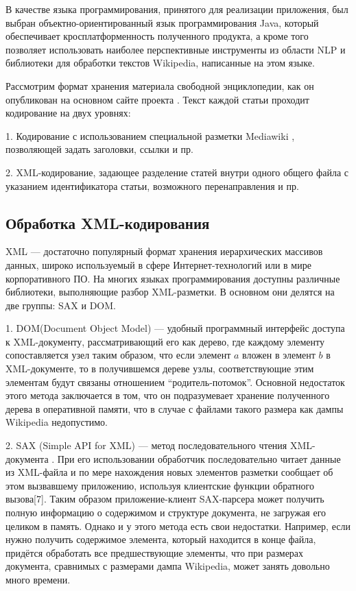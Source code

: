 В качестве языка программирования, принятого для реализации приложения,
был выбран объектно-ориентированный язык программирования Java, 
который обеспечивает кросплатформенность полученного продукта,
а кроме того позволяет использовать наиболее перспективные инструменты из области
NLP и библиотеки для обработки текстов Wikipedia, написанные на этом языке.

Рассмотрим формат хранения материала свободной энциклопедии, как он
опубликован на основном сайте проекта \cite{download}. Текст каждой статьи проходит
кодирование на двух уровнях:

1. Кодирование с использованием специальной разметки Mediawiki \cite{wikimarkup},
позволяющей задать заголовки, ссылки и пр.

2. XML-кодирование, задающее разделение статей внутри одного общего
файла с указанием идентификатора статьи, возможного перенаправления и
пр.

\subsection{Обработка XML-кодирования}

XML --- достаточно популярный формат хранения иерархических массивов
данных, широко используемый в сфере Интернет-технологий или в мире
корпоративного ПО. На многих языках программирования доступны
различные библиотеки, выполняющие разбор XML-разметки. В основном они
делятся на две группы: SAX и DOM.

1. DOM(Document Object Model) \cite{dom} --- удобный программный интерфейс доступа 
к XML-документу, рассматривающий его как дерево, где каждому элементу 
сопоставляется узел таким образом, что если элемент $a$ вложен в элемент $b$ 
в XML-документе, то в получившемся дереве узлы, соответствующие этим элементам 
будут связаны отношением “родитель-потомок”.
Основной недостаток этого метода заключается в том, что он подразумевает хранение 
полученного дерева в оперативной памяти, что в случае с файлами такого размера 
как дампы Wikipedia недопустимо.

2. SAX (Simple API for XML) --- метод последовательного чтения XML-документа \cite{sax}. 
При его использовании обработчик последовательно читает данные
из XML-файла и по мере нахождения новых элементов разметки сообщает об этом вызвавшему приложению, 
используя клиентские функции обратного вызова[7]. Таким образом приложение-клиент 
SAX-парсера может получить полную информацию о содержимом и структуре документа,
не загружая его целиком в память. Однако и у этого метода есть свои недостатки. 
Например, если нужно получить содержимое элемента, который находится в конце файла,
придётся обработать все предшествующие элементы, что при размерах документа, сравнимых
с размерами дампа Wikipedia, может занять довольно много времени.


